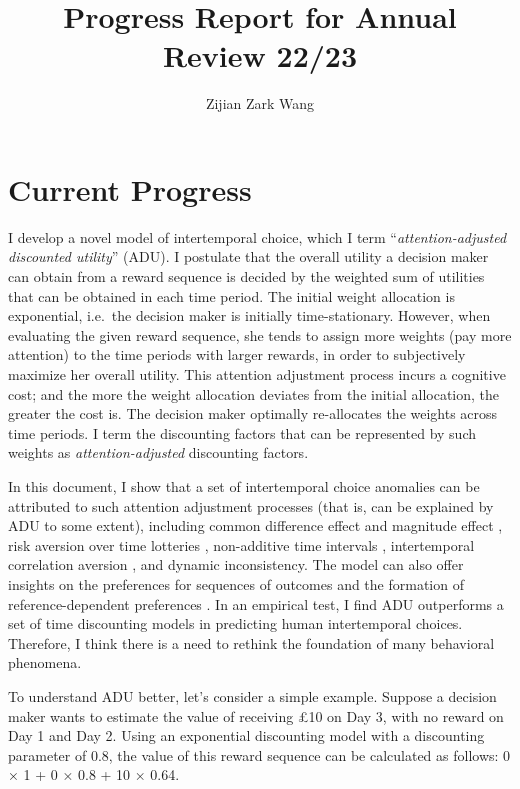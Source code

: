 \documentclass[
  12pt,
]{article}
\title{Progress Report for Annual Review 22/23}
\author{Zijian Zark Wang}
\date{}
\begin{document}
\maketitle

\hypertarget{current-progress}{%
\section{Current Progress}\label{current-progress}}

I develop a novel model of intertemporal choice, which I term
``\emph{attention-adjusted discounted utility}'' (ADU). I postulate that
the overall utility a decision maker can obtain from a reward sequence
is decided by the weighted sum of utilities that can be obtained in each
time period. The initial weight allocation is exponential, i.e.~the
decision maker is initially time-stationary. However, when evaluating
the given reward sequence, she tends to assign more weights (pay more
attention) to the time periods with larger rewards, in order to
subjectively maximize her overall utility. This attention adjustment
process incurs a cognitive cost; and the more the weight allocation
deviates from the initial allocation, the greater the cost is. The
decision maker optimally re-allocates the weights across time periods. I
term the discounting factors that can be represented by such weights as
\emph{attention-adjusted} discounting factors.

In this document, I show that a set of intertemporal choice anomalies
can be attributed to such attention adjustment processes (that is, can
be explained by ADU to some extent), including common difference effect
and magnitude effect \citep{loewenstein_anomalies_1992}, risk aversion
over time lotteries
\citep{onay_intertemporal_2007, dejarnette_time_2020}, non-additive time
intervals \citep{read_is_2001, scholten_discounting_2006}, intertemporal
correlation aversion \citep{andersen_multiattribute_2018}, and dynamic
inconsistency. The model can also offer insights on the preferences for
sequences of outcomes \citep{loewenstein_preferences_1993} and the
formation of reference-dependent preferences \citep{koszegi_model_2006}.
In an empirical test, I find ADU outperforms a set of time discounting
models in predicting human intertemporal choices. Therefore, I think
there is a need to rethink the foundation of many behavioral phenomena.

To understand ADU better, let's consider a simple example. Suppose a
decision maker wants to estimate the value of receiving £10 on Day 3,
with no reward on Day 1 and Day 2. Using an exponential discounting
model with a discounting parameter of 0.8, the value of this reward
sequence can be calculated as follows: 0 × 1 + 0 × 0.8 + 10 × 0.64.
\end{document}
